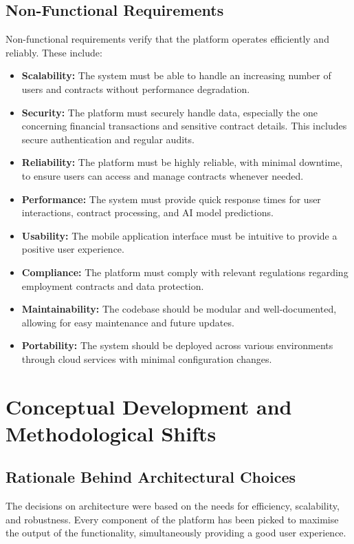 \subsection{Non-Functional Requirements}

Non-functional requirements verify that the platform operates efficiently and reliably. These include:

\begin{itemize}
    \item \textbf{Scalability:} The system must be able to handle an increasing number of users and contracts without performance degradation.
    \item \textbf{Security:} The platform must securely handle data, especially the one concerning financial transactions and sensitive contract details. This includes secure authentication and regular audits.
    \item \textbf{Reliability:} The platform must be highly reliable, with minimal downtime, to ensure users can access and manage contracts whenever needed.
    \item \textbf{Performance:} The system must provide quick response times for user interactions, contract processing, and AI model predictions.
    \item \textbf{Usability:} The mobile application interface must be intuitive to provide a positive user experience.
    \item \textbf{Compliance:} The platform must comply with relevant regulations regarding employment contracts and data protection.
    \item \textbf{Maintainability:} The codebase should be modular and well-documented, allowing for easy maintenance and future updates.
    \item \textbf{Portability:} The system should be deployed across various environments through cloud services with minimal configuration changes.
\end{itemize}

\section{Conceptual Development and Methodological Shifts}

\subsection{Rationale Behind Architectural Choices}

The decisions on architecture were based on the needs for efficiency, scalability, and robustness. Every component of the platform has been picked to maximise the output of the functionality, simultaneously providing a good user experience.

